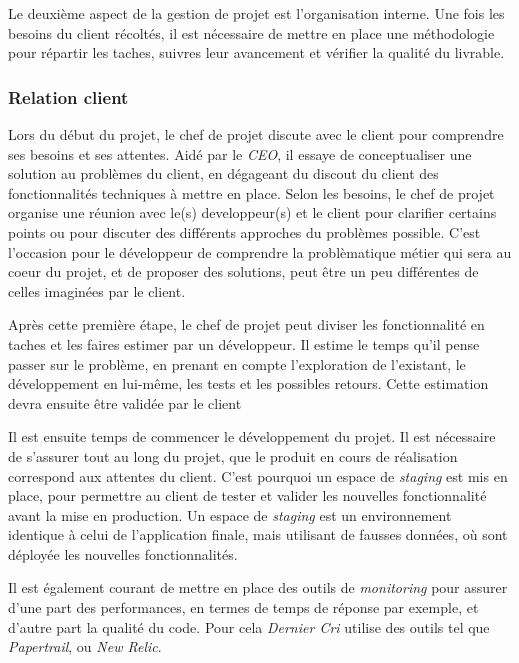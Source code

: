 \documentclass[12pt,a4paper]{article}
\begin{document}
  Le deuxième aspect de la gestion de projet est l'organisation interne.
  Une fois les besoins du client récoltés, il est nécessaire de mettre en
  place une méthodologie pour répartir les taches, suivres leur avancement
  et vérifier la qualité du livrable.

  \bigskip

  \subsubsection{Relation client}\label{relation-client}

  \bigskip

  Lors du début du projet, le chef de projet discute avec le client pour
  comprendre ses besoins et ses attentes. Aidé par le \emph{CEO}, il
  essaye de conceptualiser une solution au problèmes du client, en
  dégageant du discout du client des fonctionnalités techniques à mettre
  en place. Selon les besoins, le chef de projet organise une réunion avec
  le(s) developpeur(s) et le client pour clarifier certains points ou pour
  discuter des différents approches du problèmes possible. C'est
  l'occasion pour le développeur de comprendre la problèmatique métier qui
  sera au coeur du projet, et de proposer des solutions, peut être un peu
  différentes de celles imaginées par le client.

  \bigskip

  Après cette première étape, le chef de projet peut diviser les
  fonctionnalité en taches et les faires estimer par un développeur. Il
  estime le temps qu'il pense passer sur le problème, en prenant en compte
  l'exploration de l'existant, le développement en lui-même, les tests et
  les possibles retours. Cette estimation devra ensuite être validée par
  le client

  \bigskip

  Il est ensuite temps de commencer le développement du projet. Il est
  nécessaire de s'assurer tout au long du projet, que le produit en cours
  de réalisation correspond aux attentes du client. C'est pourquoi un
  espace de \emph{staging} est mis en place, pour permettre au client de
  tester et valider les nouvelles fonctionnalité avant la mise en
  production. Un espace de \emph{staging} est un environnement identique à
  celui de l'application finale, mais utilisant de fausses données, où
  sont déployée les nouvelles fonctionnalités.

  \bigskip

  Il est également courant de mettre en place des outils de
  \emph{monitoring} pour assurer d'une part des performances, en termes de
  temps de réponse par exemple, et d'autre part la qualité du code. Pour
  cela \emph{Dernier Cri} utilise des outils tel que \emph{Papertrail}, ou
  \emph{New Relic}.
\end{document}
